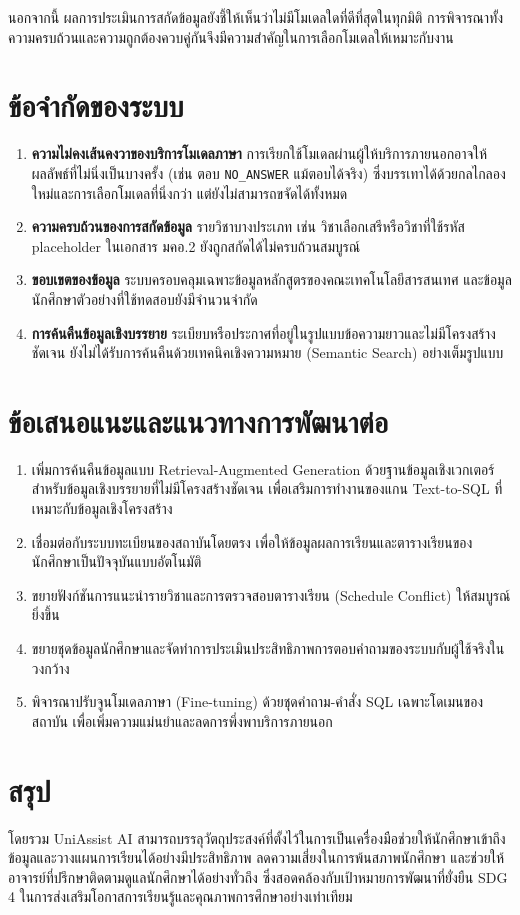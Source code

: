 นอกจากนี้ ผลการประเมินการสกัดข้อมูลยังชี้ให้เห็นว่าไม่มีโมเดลใดที่ดีที่สุดในทุกมิติ การพิจารณาทั้งความครบถ้วนและความถูกต้องควบคู่กันจึงมีความสำคัญในการเลือกโมเดลให้เหมาะกับงาน

\section{ข้อจำกัดของระบบ}

\begin{enumerate}
    \item \textbf{ความไม่คงเส้นคงวาของบริการโมเดลภาษา} การเรียกใช้โมเดลผ่านผู้ให้บริการภายนอกอาจให้ผลลัพธ์ที่ไม่นิ่งเป็นบางครั้ง (เช่น ตอบ \texttt{NO\_ANSWER} แม้ตอบได้จริง) ซึ่งบรรเทาได้ด้วยกลไกลองใหม่และการเลือกโมเดลที่นิ่งกว่า แต่ยังไม่สามารถขจัดได้ทั้งหมด
    \item \textbf{ความครบถ้วนของการสกัดข้อมูล} รายวิชาบางประเภท เช่น วิชาเลือกเสรีหรือวิชาที่ใช้รหัส placeholder ในเอกสาร มคอ.2 ยังถูกสกัดได้ไม่ครบถ้วนสมบูรณ์
    \item \textbf{ขอบเขตของข้อมูล} ระบบครอบคลุมเฉพาะข้อมูลหลักสูตรของคณะเทคโนโลยีสารสนเทศ และข้อมูลนักศึกษาตัวอย่างที่ใช้ทดสอบยังมีจำนวนจำกัด
    \item \textbf{การค้นคืนข้อมูลเชิงบรรยาย} ระเบียบหรือประกาศที่อยู่ในรูปแบบข้อความยาวและไม่มีโครงสร้างชัดเจน ยังไม่ได้รับการค้นคืนด้วยเทคนิคเชิงความหมาย (Semantic Search) อย่างเต็มรูปแบบ
\end{enumerate}

\section{ข้อเสนอแนะและแนวทางการพัฒนาต่อ}

\begin{enumerate}
    \item เพิ่มการค้นคืนข้อมูลแบบ Retrieval-Augmented Generation ด้วยฐานข้อมูลเชิงเวกเตอร์ สำหรับข้อมูลเชิงบรรยายที่ไม่มีโครงสร้างชัดเจน เพื่อเสริมการทำงานของแกน Text-to-SQL ที่เหมาะกับข้อมูลเชิงโครงสร้าง
    \item เชื่อมต่อกับระบบทะเบียนของสถาบันโดยตรง เพื่อให้ข้อมูลผลการเรียนและตารางเรียนของนักศึกษาเป็นปัจจุบันแบบอัตโนมัติ
    \item ขยายฟังก์ชันการแนะนำรายวิชาและการตรวจสอบตารางเรียน (Schedule Conflict) ให้สมบูรณ์ยิ่งขึ้น
    \item ขยายชุดข้อมูลนักศึกษาและจัดทำการประเมินประสิทธิภาพการตอบคำถามของระบบกับผู้ใช้จริงในวงกว้าง
    \item พิจารณาปรับจูนโมเดลภาษา (Fine-tuning) ด้วยชุดคำถาม-คำสั่ง SQL เฉพาะโดเมนของสถาบัน เพื่อเพิ่มความแม่นยำและลดการพึ่งพาบริการภายนอก
\end{enumerate}

\section{สรุป}

โดยรวม UniAssist AI สามารถบรรลุวัตถุประสงค์ที่ตั้งไว้ในการเป็นเครื่องมือช่วยให้นักศึกษาเข้าถึงข้อมูลและวางแผนการเรียนได้อย่างมีประสิทธิภาพ ลดความเสี่ยงในการพ้นสภาพนักศึกษา และช่วยให้อาจารย์ที่ปรึกษาติดตามดูแลนักศึกษาได้อย่างทั่วถึง ซึ่งสอดคล้องกับเป้าหมายการพัฒนาที่ยั่งยืน SDG 4 ในการส่งเสริมโอกาสการเรียนรู้และคุณภาพการศึกษาอย่างเท่าเทียม

